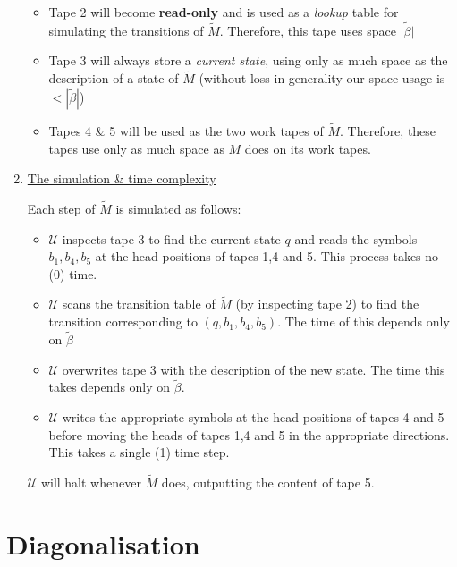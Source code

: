 \documentclass{article}
\begin{document}
\begin{enumerate}
\begin{itemize}
          \item Tape 2 will become \textbf{read-only} and is used as a \textit{lookup} table for simulating the transitions of $\tilde{M}$. Therefore, this tape uses space $\tilde{|\beta|}$

          \item Tape 3 will always store a \textit{current state}, using only as much space as the description of a state of $\tilde{M}$ (without loss in generality our space usage is $< | \tilde{\beta} | $)

                \item Tapes 4 \& 5 will be used as the two work tapes of $\tilde{M}$. Therefore, these tapes use only as much space as $M$ does on its work tapes.

        \end{itemize}

  \item \underline{The simulation \& time complexity}

        Each step of $\tilde{M}$ is simulated as follows:

        \begin{itemize}
          \item $\mathcal{U} $ inspects tape 3 to find the current state $q$ and reads the symbols $b_{1},b_{4}, b_{5}$ at the head-positions of tapes 1,4 and 5. This process takes no (0) time.
          \item $\mathcal{U}$ scans the transition table of $\tilde{M}$ (by inspecting tape 2) to find the transition corresponding to $(q,b_{1}, b_{4}, b_{5})$. The time of this depends only on $\tilde{\beta}$
          \item $\mathcal{U}$ overwrites tape 3 with the description of the new state. The time this takes depends only on $\tilde{\beta}$.
                \item $\mathcal{U}$ writes the appropriate symbols at the head-positions of tapes 4 and 5 before moving the heads of tapes 1,4 and 5 in the appropriate directions. This takes a single (1) time step.
        \end{itemize}

        $\mathcal{U}$ will halt whenever $\tilde{M}$ does, outputting the content of tape 5.

\end{enumerate}

\section{Diagonalisation}
\label{sec:diagonalisation}
\end{document}
